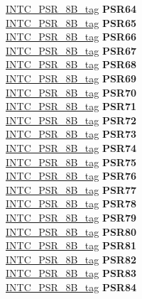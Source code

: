 \begin{DoxyCompactItemize}
\begin{tabbing}
\>\>\mbox{\hyperlink{unionINTC__PSR__8B__tag}{INTC\_PSR\_8B\_tag}} {\bfseries PSR64}\\
\>\>\mbox{\hyperlink{unionINTC__PSR__8B__tag}{INTC\_PSR\_8B\_tag}} {\bfseries PSR65}\\
\>\>\mbox{\hyperlink{unionINTC__PSR__8B__tag}{INTC\_PSR\_8B\_tag}} {\bfseries PSR66}\\
\>\>\mbox{\hyperlink{unionINTC__PSR__8B__tag}{INTC\_PSR\_8B\_tag}} {\bfseries PSR67}\\
\>\>\mbox{\hyperlink{unionINTC__PSR__8B__tag}{INTC\_PSR\_8B\_tag}} {\bfseries PSR68}\\
\>\>\mbox{\hyperlink{unionINTC__PSR__8B__tag}{INTC\_PSR\_8B\_tag}} {\bfseries PSR69}\\
\>\>\mbox{\hyperlink{unionINTC__PSR__8B__tag}{INTC\_PSR\_8B\_tag}} {\bfseries PSR70}\\
\>\>\mbox{\hyperlink{unionINTC__PSR__8B__tag}{INTC\_PSR\_8B\_tag}} {\bfseries PSR71}\\
\>\>\mbox{\hyperlink{unionINTC__PSR__8B__tag}{INTC\_PSR\_8B\_tag}} {\bfseries PSR72}\\
\>\>\mbox{\hyperlink{unionINTC__PSR__8B__tag}{INTC\_PSR\_8B\_tag}} {\bfseries PSR73}\\
\>\>\mbox{\hyperlink{unionINTC__PSR__8B__tag}{INTC\_PSR\_8B\_tag}} {\bfseries PSR74}\\
\>\>\mbox{\hyperlink{unionINTC__PSR__8B__tag}{INTC\_PSR\_8B\_tag}} {\bfseries PSR75}\\
\>\>\mbox{\hyperlink{unionINTC__PSR__8B__tag}{INTC\_PSR\_8B\_tag}} {\bfseries PSR76}\\
\>\>\mbox{\hyperlink{unionINTC__PSR__8B__tag}{INTC\_PSR\_8B\_tag}} {\bfseries PSR77}\\
\>\>\mbox{\hyperlink{unionINTC__PSR__8B__tag}{INTC\_PSR\_8B\_tag}} {\bfseries PSR78}\\
\>\>\mbox{\hyperlink{unionINTC__PSR__8B__tag}{INTC\_PSR\_8B\_tag}} {\bfseries PSR79}\\
\>\>\mbox{\hyperlink{unionINTC__PSR__8B__tag}{INTC\_PSR\_8B\_tag}} {\bfseries PSR80}\\
\>\>\mbox{\hyperlink{unionINTC__PSR__8B__tag}{INTC\_PSR\_8B\_tag}} {\bfseries PSR81}\\
\>\>\mbox{\hyperlink{unionINTC__PSR__8B__tag}{INTC\_PSR\_8B\_tag}} {\bfseries PSR82}\\
\>\>\mbox{\hyperlink{unionINTC__PSR__8B__tag}{INTC\_PSR\_8B\_tag}} {\bfseries PSR83}\\
\>\>\mbox{\hyperlink{unionINTC__PSR__8B__tag}{INTC\_PSR\_8B\_tag}} {\bfseries PSR84}\\

\end{tabbing}
\end{DoxyCompactItemize}
